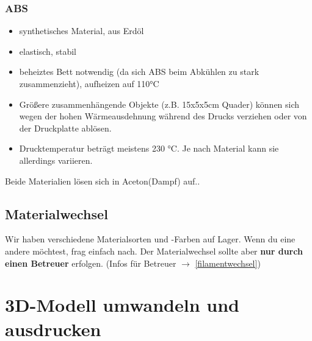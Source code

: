 \documentclass{\basedir/fablab-document}
\begin{document}
\subsubsection{ABS}
\begin{itemize}
 \item synthetisches Material, aus Erdöl
 \item elastisch, stabil
 \item beheiztes Bett notwendig (da sich ABS beim Abkühlen zu stark zusammenzieht), aufheizen auf 110°C
 \item Größere zusammenhängende Objekte (z.B. 15x5x5cm Quader) können sich wegen der hohen Wärmeausdehnung während des Drucks verziehen oder von der Druckplatte ablösen.
 \item Drucktemperatur beträgt meistens 230 °C. Je nach Material kann sie allerdings variieren.
\end{itemize}

Beide Materialien lösen sich in Aceton(Dampf) auf..

\subsection{Materialwechsel}
Wir haben verschiedene Materialsorten und -Farben auf Lager. Wenn du eine andere möchtest, frag einfach nach.
Der Materialwechsel sollte aber \textbf{nur durch einen Betreuer} erfolgen. (Infos für Betreuer $\to$ \ref{filamentwechsel})


\section{3D-Modell umwandeln und ausdrucken}
\end{document}
